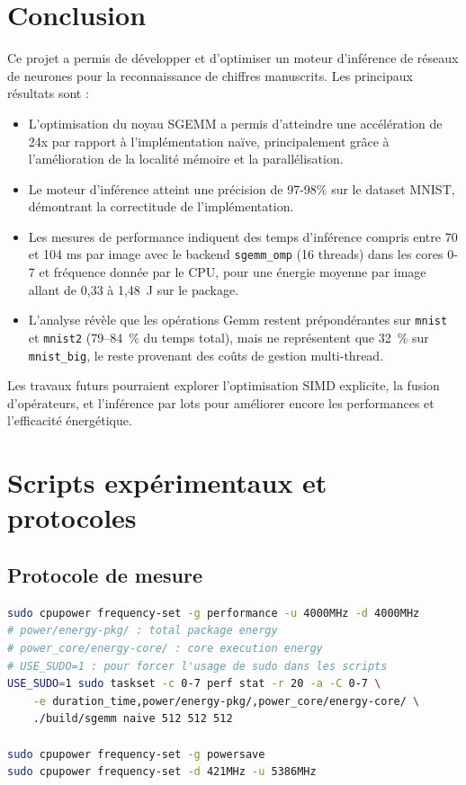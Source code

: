 \documentclass[a4paper,11pt]{article}
\begin{document}
\vspace{2\baselineskip}

\section{Conclusion}\label{sec:conclusion}

Ce projet a permis de développer et d'optimiser un moteur d'inférence de réseaux de neurones pour la reconnaissance de chiffres manuscrits. Les principaux résultats sont :

\begin{itemize}
\item L'optimisation du noyau SGEMM a permis d'atteindre une accélération de 24x par rapport à l'implémentation naïve, principalement grâce à l'amélioration de la localité mémoire et la parallélisation.

\item Le moteur d'inférence atteint une précision de 97-98\% sur le dataset MNIST, démontrant la correctitude de l'implémentation.

\item Les mesures de performance indiquent des temps d'inférence compris entre 70 et 104 ms par image avec le backend \texttt{sgemm\_omp} (16 threads) dans les cores 0-7 et fréquence donnée par le CPU, pour une énergie moyenne par image allant de 0,33 à 1,48~J sur le package.

\item L'analyse révèle que les opérations Gemm restent prépondérantes sur \texttt{mnist} et \texttt{mnist2} (79--84~\% du temps total), mais ne représentent que 32~\% sur \texttt{mnist\_big}, le reste provenant des coûts de gestion multi-thread.
\end{itemize}

Les travaux futurs pourraient explorer l'optimisation SIMD explicite, la fusion d'opérateurs, et l'inférence par lots pour améliorer encore les performances et l'efficacité énergétique.

\appendix
\section{Scripts expérimentaux et protocoles}\label{sec:appendix-scripts}

\subsection{Protocole de mesure}\label{app:protocol}
\begin{lstlisting}[language=bash]
sudo cpupower frequency-set -g performance -u 4000MHz -d 4000MHz
# power/energy-pkg/ : total package energy
# power_core/energy-core/ : core execution energy
# USE_SUDO=1 : pour forcer l'usage de sudo dans les scripts
USE_SUDO=1 sudo taskset -c 0-7 perf stat -r 20 -a -C 0-7 \
    -e duration_time,power/energy-pkg/,power_core/energy-core/ \
    ./build/sgemm naive 512 512 512

sudo cpupower frequency-set -g powersave
sudo cpupower frequency-set -d 421MHz -u 5386MHz
\end{lstlisting}
\end{document}
